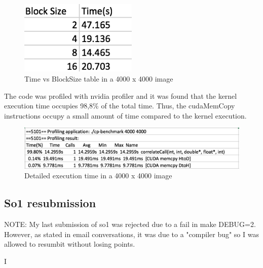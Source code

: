 \documentclass[a4paper,10pt]{article}
\begin{document}
\begin{figure}[H]
\centering
\includegraphics[width=0.5\textwidth]{figures/w4_blockSizeTable}
\caption{Time vs BlockSize table in a 4000 x 4000 image}
\label{fig:pca_type}
\end{figure}

The code was profiled with nvidia profiler and it was found that the kernel execution time occupies 98,8\% of the total time. Thus, the cudaMemCopy instructions occupy a small amount of time compared to the kernel execution. 

\begin{figure}[H]
\centering
\includegraphics[width=1\textwidth]{figures/w4_timing}
\caption{Detailed execution time in a 4000 x 4000 image}
\label{fig:pca_type}
\end{figure}

\subsection{So1 resubmission}
NOTE: My last submission of so1 was rejected due to a fail in make DEBUG=2. However, as stated in email conversations, it was due to a "compiler bug" so I was allowed to resumbit without losing points.  


I
\end{document}
